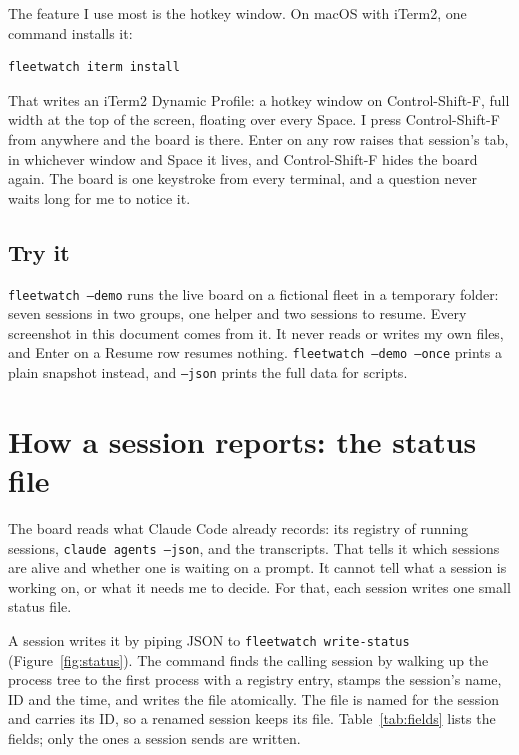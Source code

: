 \documentclass[11pt, letterpaper]{article}
\newenvironment{code}{\par\smallskip\small}{\par\smallskip}
\newcommand{\cmd}[1]{\texttt{#1}}
\begin{document}
The feature I use most is the hotkey window. On macOS with iTerm2, one command installs it:

\begin{code}
\begin{verbatim}
fleetwatch iterm install
\end{verbatim}
\end{code}

That writes an iTerm2 Dynamic Profile: a hotkey window on Control-Shift-F, full width at the
top of the screen, floating over every Space. I press Control-Shift-F from anywhere and the
board is there. Enter on any row raises that session's tab, in whichever window and Space
it lives, and Control-Shift-F hides the board again. The board is one keystroke from every
terminal, and a question never waits long for me to notice it.

\subsection{Try it}

\cmd{fleetwatch --demo} runs the live board on a fictional fleet in a temporary folder:
seven sessions in two groups, one helper and two sessions to resume. Every screenshot in
this document comes from it. It never reads or writes my own files, and Enter on a Resume
row resumes nothing. \cmd{fleetwatch --demo --once} prints a plain snapshot instead, and
\cmd{--json} prints the full data for scripts.

\section{How a session reports: the status file}

The board reads what Claude Code already records: its registry of running sessions,
\cmd{claude agents --json}, and the transcripts. That tells it which sessions are alive and
whether one is waiting on a prompt. It cannot tell what a session is working on, or what it
needs me to decide. For that, each session writes one small status file.

A session writes it by piping JSON to \cmd{fleetwatch write-status}
(Figure~\ref{fig:status}). The command finds the calling session by walking up the process
tree to the first process with a registry entry, stamps the session's name, ID and the time,
and writes the file atomically. The file is named for the session and carries its ID, so a
renamed session keeps its file. Table~\ref{tab:fields} lists the fields; only the ones a session sends are
written.
\end{document}
